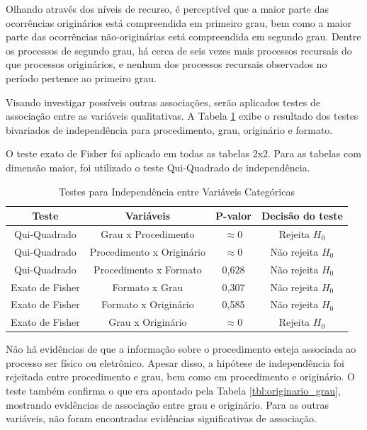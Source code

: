 Olhando através dos níveis de recurso, é perceptível que a maior parte das ocorrências originários está compreendida em primeiro grau, bem como a maior parte das ocorrências não-originárias está compreendida em segundo grau. Dentre os processos de segundo grau, há cerca de seis vezes mais processos recursais do que processos originários, e nenhum dos processos recursais observados no período pertence ao primeiro grau.

Visando investigar possíveis outras associações, serão aplicados testes de associação entre as variáveis qualitativas. A Tabela \ref{tbl:assoc_categoricas} exibe o resultado dos testes bivariados de independência para procedimento, grau, originário e formato.

O teste exato de Fisher foi aplicado em todas as tabelas 2x2. Para as tabelas com dimensão maior, foi utilizado o teste Qui-Quadrado de independência.

\begin{table}[H]
\centering
\caption{Testes para Independência entre Variáveis Categóricas}
\begin{tabular}{|cccc|}
\hline
\textbf{Teste} & \textbf{Variáveis} & \textbf{P-valor} & \textbf{Decisão do teste} \\ \hline
Qui-Quadrado & Grau x Procedimento & $\approx 0$   & Rejeita $H_0$  \\ \hline 
Qui-Quadrado & Procedimento x Originário & $\approx 0$   & Não rejeita $H_0$  \\ \hline  
Qui-Quadrado & Procedimento x Formato & 0,628   & Não rejeita $H_0$  \\ \hline
Exato de Fisher & Formato x Grau & 0,307 & Não rejeita $H_0$  \\ \hline
Exato de Fisher & Formato x Originário & 0,585 & Não rejeita $H_0$  \\ \hline
Exato de Fisher & Grau x Originário & $\approx 0$   & Rejeita $H_0$  \\ \hline 
\end{tabular}
\label{tbl:assoc_categoricas}
\end{table}

Não há evidências de que a informação sobre o procedimento esteja associada ao processo ser físico ou eletrônico. Apesar disso, a hipótese de independência foi rejeitada entre procedimento e grau, bem como em procedimento e originário. O teste também confirma o que era apontado pela Tabela \ref{tbl:originario_grau}, mostrando evidências de associação entre grau e originário. Para as outras variáveis, não foram encontradas evidências significativas de associação.


